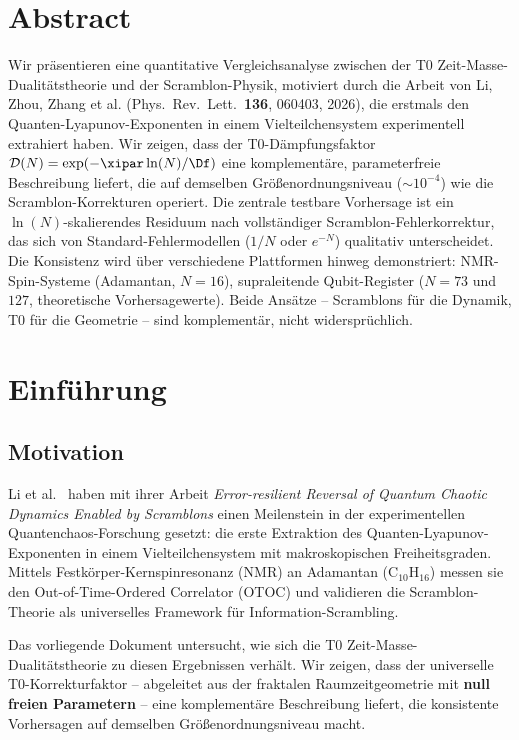 \section*{Abstract}
Wir präsentieren eine quantitative Vergleichsanalyse zwischen der T0 Zeit-Masse-Dualitätstheorie und der Scramblon-Physik, motiviert durch die Arbeit von Li, Zhou, Zhang et al. (Phys.\ Rev.\ Lett.\ \textbf{136}, 060403, 2026), die erstmals den Quanten-Lyapunov-Exponenten in einem Vielteilchensystem experimentell extrahiert haben. Wir zeigen, dass der T0-Dämpfungsfaktor $\mathcal{D}(N) = \exp(-\xipar \ln(N)/\Df)$ eine komplementäre, parameterfreie Beschreibung liefert, die auf demselben Größenordnungsniveau ($\sim 10^{-4}$) wie die Scramblon-Korrekturen operiert. Die zentrale testbare Vorhersage ist ein $\ln(N)$-skalierendes Residuum nach vollständiger Scramblon-Fehlerkorrektur, das sich von Standard-Fehlermodellen ($1/N$ oder $e^{-N}$) qualitativ unterscheidet. Die Konsistenz wird über verschiedene Plattformen hinweg demonstriert: NMR-Spin-Systeme (Adamantan, $N=16$), supraleitende Qubit-Register ($N = 73$ und $127$, theoretische Vorhersagewerte). Beide Ansätze -- Scramblons für die Dynamik, T0 für die Geometrie -- sind komplementär, nicht widersprüchlich.

\clearpage

\section{Einführung}
\label{sec:intro}

\subsection{Motivation}

Li et al.\ \cite{li_scramblons_2026} haben mit ihrer Arbeit \emph{Error-resilient Reversal of Quantum Chaotic Dynamics Enabled by Scramblons} einen Meilenstein in der experimentellen Quantenchaos-Forschung gesetzt: die erste Extraktion des Quanten-Lyapunov-Exponenten in einem Vielteilchensystem mit makroskopischen Freiheitsgraden. Mittels Festkörper-Kernspinresonanz (NMR) an Adamantan (C$_{10}$H$_{16}$) messen sie den Out-of-Time-Ordered Correlator (OTOC) und validieren die Scramblon-Theorie als universelles Framework für Information-Scrambling.

Das vorliegende Dokument untersucht, wie sich die T0 Zeit-Masse-Dualitätstheorie \cite{pascher_t0_2025} zu diesen Ergebnissen verhält. Wir zeigen, dass der universelle T0-Korrekturfaktor -- abgeleitet aus der fraktalen Raumzeitgeometrie mit \textbf{null freien Parametern} -- eine komplementäre Beschreibung liefert, die konsistente Vorhersagen auf demselben Größenordnungsniveau macht.

